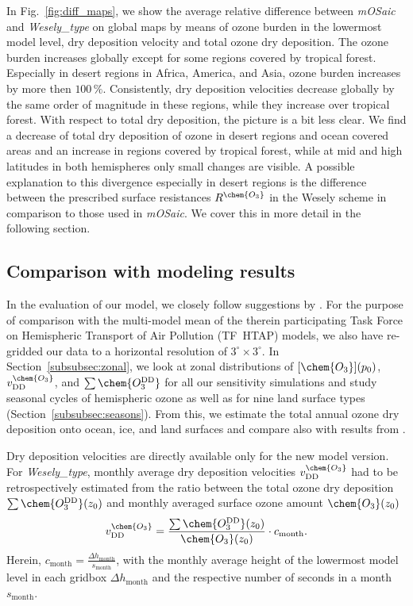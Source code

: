\documentclass[gmd, manuscript]{copernicus}
\begin{document}
%
In Fig.~\ref{fig:diff_maps}, we show the average relative difference between \emph{mOSaic} and \emph{Wesely\_type} on global maps by means of ozone burden in the lowermost model level, dry deposition velocity and total ozone dry deposition. The ozone burden increases globally except for some regions covered by tropical forest. Especially in desert regions in Africa, America, and Asia, ozone burden increases by more then $100\,\unit{\%}$. Consistently, dry deposition velocities decrease globally by the same order of magnitude in these regions, while they increase over tropical forest. With respect to total dry deposition, the picture is a bit less clear. We find a decrease of total dry deposition of ozone in desert regions and ocean covered areas and an increase in regions covered by tropical forest, while at mid and high latitudes in both hemispheres only small changes are visible. A possible explanation to this divergence especially in desert regions is the difference between the prescribed surface resistances $R^\chem{O_3}$ in the Wesely scheme in comparison to those used in \emph{mOSaic}. We cover this in more detail in the following section.

\subsection{Comparison with modeling results}
\label{subsec:model}
%
In the evaluation of our model, we closely follow suggestions by \citet{ACP:Hardacre2015}. For the purpose of comparison with the multi-model mean of the therein participating Task Force on Hemispheric Transport of Air Pollution (TF~HTAP) models, we also have re-gridded our data to a horizontal resolution of $3^\circ\times 3^\circ$. In Section~\ref{subsubsec:zonal}, we look at zonal distributions of $[\chem{O_3}](p_0)$, $v^\chem{O_3}_\text{DD}$, and $\sum\chem{O_3^\text{DD}}$ for all our sensitivity simulations and study seasonal cycles of hemispheric ozone as well as for nine land surface types (Section~\ref{subsubsec:seasons}). From this, we estimate the total annual ozone dry deposition onto ocean, ice, and land surfaces and compare also with results from \citet{ACP:Luhar2017}.

Dry deposition velocities are directly available only for the new model version. For \emph{Wesely\_type}, monthly average dry deposition velocities $v^\chem{O_3}_\text{DD}$ had to be retrospectively estimated from the ratio between the total ozone dry deposition $\sum \chem{O_3^\text{DD}}(z_0)$ and monthly averaged surface ozone amount $\chem{O_3}(z_0)$ 
\begin{equation}
  v^\chem{O_3}_\text{DD} = \frac{\sum \chem{O_3^\text{DD}}(z_0)}{\chem{O_3}(z_0)}\cdot c_\text{month}.
  \label{eq:retro_vdd}
\end{equation}
Herein, $c_\text{month} = \frac{\Delta h_\text{month}}{s_\text{month}}$, with the monthly average height of the lowermost model level in each gridbox $\Delta h_\text{month}$ and the respective number of seconds in a month $s_\text{month}$. 
%
\end{document}
